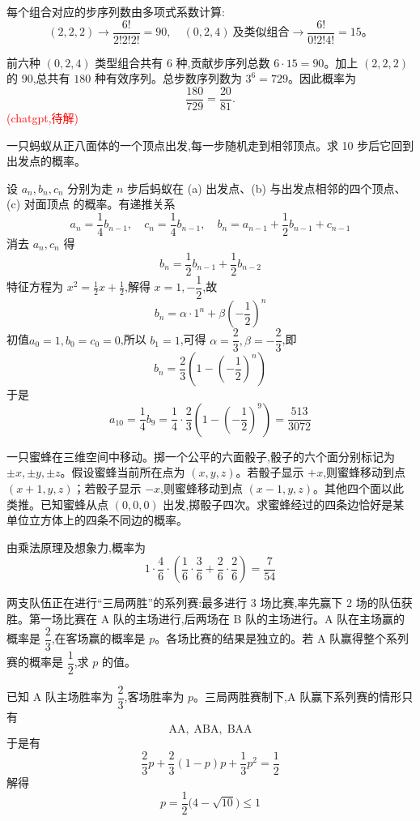 \begin{questions}
\begin{solution}
每个组合对应的步序列数由多项式系数计算:
\[
(2,2,2) \rightarrow \frac{6!}{2!2!2!}=90,\quad
(0,2,4)\ \text{及类似组合} \rightarrow \frac{6!}{0!2!4!}=15。
\]

前六种 $(0,2,4)$ 类型组合共有 6 种,贡献步序列总数 $6\cdot 15=90$。加上 $(2,2,2)$ 的 90,总共有 $180$ 种有效序列。总步数序列数为 $3^6=729$。因此概率为
\[
\frac{180}{729}=\frac{20}{81}.
\]
\textcolor{red}{(chatgpt,待解)}
\end{solution}

    \question 一只蚂蚁从正八面体的一个顶点出发,每一步随机走到相邻顶点。求 10 步后它回到出发点的概率。  
    \begin{solution}
        设 $a_n,b_n,c_n$ 分别为走 $n$ 步后蚂蚁在 (a) 出发点、(b) 与出发点相邻的四个顶点、(c) 对面顶点 的概率。有递推关系
        \[
        a_n=\frac{1}{4}b_{n-1}, \quad c_n=\frac{1}{4}b_{n-1}, \quad b_n=a_{n-1}+\frac{1}{2}b_{n-1}+c_{n-1}
        \]
        消去 $a_n,c_n$ 得
        \[
        b_n=\frac{1}{2}b_{n-1}+\frac{1}{2}b_{n-2}
        \]
        特征方程为 $x^2=\frac{1}{2}x+\frac{1}{2}$,解得 $x=1,-\dfrac{1}{2}$,故
        \[
        b_n=\alpha\cdot 1^n+\beta\left(-\frac{1}{2}\right)^n
        \]
        初值$a_0=1,b_0=c_0=0$,所以 $b_1=1$,可得 $\alpha=\dfrac{2}{3}, \beta=-\dfrac{2}{3}$,即
        \[
        b_n=\frac{2}{3}\left(1-\left(-\frac{1}{2}\right)^n\right)
        \]
        于是
        \[
        a_{10}=\frac{1}{4}b_{9}=\frac{1}{4}\cdot \frac{2}{3}\left(1-\left(-\frac{1}{2}\right)^9\right)
        =\frac{513}{3072}
        \]
    \end{solution}

    \question 一只蜜蜂在三维空间中移动。掷一个公平的六面骰子,骰子的六个面分别标记为 \( \pm x, \pm y, \pm z \)。假设蜜蜂当前所在点为 \( (x,y,z) \)。若骰子显示 \( +x \),则蜜蜂移动到点 \( (x+1, y, z) \)；若骰子显示 \( -x \),则蜜蜂移动到点 \( (x-1, y, z) \)。其他四个面以此类推。已知蜜蜂从点 \( (0,0,0) \) 出发,掷骰子四次。求蜜蜂经过的四条边恰好是某单位立方体上的四条不同边的概率。 
    \begin{solution}
        由乘法原理及想象力,概率为
        \[
        1\cdot \dfrac{4}{6}\cdot \left(\dfrac{1}{6}\cdot \dfrac{3}{6}+\dfrac{2}{6}\cdot \dfrac{2}{6}\right)=\frac{7}{54}
        \]
    \end{solution}

    \question 两支队伍正在进行“三局两胜”的系列赛:最多进行 3 场比赛,率先赢下 2 场的队伍获胜。第一场比赛在 A 队的主场进行,后两场在 B 队的主场进行。A 队在主场赢的概率是 $\dfrac{2}{3}$,在客场赢的概率是 $p$。各场比赛的结果是独立的。若 A 队赢得整个系列赛的概率是 $\dfrac{1}{2}$,求 $p$ 的值。
    \begin{solution}
        已知 A 队主场胜率为 $\dfrac23$,客场胜率为 $p$。三局两胜赛制下,A 队赢下系列赛的情形只有  
        \[
        \text{AA},\; \text{ABA},\; \text{BAA}
        \]
        于是有
        \[
        \frac23 p+\frac23(1-p)p+\frac13p^{2}=\frac12
        \]
        解得  
        \[
        p=\dfrac12\bigl(4-\sqrt{10}\bigr)\le1
        \]
    \end{solution}
    

\end{questions}
